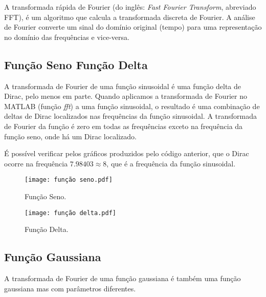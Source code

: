 A transformada rápida de Fourier (do inglês: \emph{Fast Fourier Transform}, abreviado FFT), é um algoritmo que calcula a transformada discreta de Fourier. A análise de Fourier converte um sinal do domínio original (tempo) para uma representação no domínio das frequências e vice-versa.

\subsection{Função Seno \boldmath{$\rightarrow$} Função Delta} 

A transformada de Fourier de uma função sinusoidal é uma função delta de Dirac, pelo menos em parte. Quando aplicamos a transformada de Fourier no MATLAB (função \emph{fft}) a uma função sinusoidal, o resultado é uma combinação de deltas de Dirac localizados nas frequências da função sinusoidal. A transformada de Fourier da função é zero em todas as frequências exceto na frequência da função seno, onde há um Dirac localizado.



\newpage

É possível verificar pelos gráficos produzidos pelo código anterior, que o Dirac ocorre na frequência $7.98403\approx 8$, que é a frequência da função sinusoidal.

\begin{figure}[!ht]
    \centering
    \begin{minipage}[b]{0.49\textwidth}
        \centering
        \texttt{[image: função seno.pdf]}
        \caption{Função Seno.}
    \end{minipage}
    \hfill
    \begin{minipage}[b]{0.49\textwidth}
        \centering
        \texttt{[image: função delta.pdf]}
        \caption{Função Delta.}
    \end{minipage}
\end{figure}

\subsection{Função Gaussiana}

A transformada de Fourier de uma função gaussiana é também uma função gaussiana mas com parâmetros diferentes.



